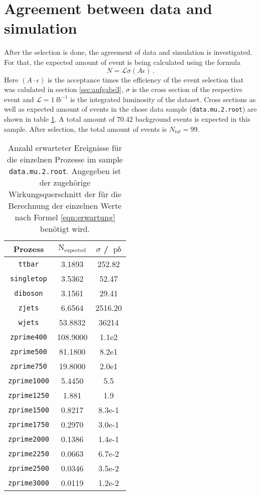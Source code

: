 \section{Agreement between data and simulation}
After the selection is done, the agreement of data and simulation is investigated.
For that, the expected amount of event is being calculated using the formula
\begin{equation}
N = \mathcal{L} \sigma (A \epsilon)\,.
\label{eqn:erwartung}
\end{equation}
Here $(A \cdot \epsilon)$ is the acceptance times the efficiency of the event selection that was calulated in section \ref{sec:aufgabe3}, $\sigma$ is the cross section of the respective event and $\mathcal{L} = \SI{1}{\femto b}^{-1}$ is the integrated luminosity of the dataset.
Cross sections as well as expected amount of events in the chose data sample (\texttt{data.mu.2.root}) are shown in table \ref{tab:Erwartungen}.
A total amount of $70.42$ background events is expected in this sample. After selection, the total amount of events is $N_{tot} = 99$.
\begin{table}[H]
    \centering
    \caption{Anzahl erwarteter Ereignisse für die einzelnen Prozesse im sample \texttt{data.mu.2.root}. Angegeben
    ist der zugehörige Wirkungsquerschnitt der für die Berechnung der einzelnen Werte nach Formel
    \eqref{eqn:erwartung} benötigt wird.}
    \label{tab:Erwartungen}
    \begin{tabular}{c|cc}
    \toprule
    Prozess & $\text{N}_\text{expected}$ & $\sigma$ / $\SI{}{\pico b}$ \\
    \midrule
    \texttt{ttbar}      &  3.1893  & 252.82    \\
    \texttt{singletop}  &  3.5362   & 52.47     \\
    \texttt{diboson}    &  3.1561   & 29.41     \\
    \texttt{zjets}      &  6.6564   & 2516.20   \\
    \texttt{wjets}      &  53.8832  & 36214     \\
    \texttt{zprime400}  &  108.9000 & 1.1e2     \\
    \texttt{zprime500}  &  81.1800  & 8.2e1     \\
    \texttt{zprime750}  &  19.8000  & 2.0e1     \\
    \texttt{zprime1000} &  5.4450  & 5.5       \\
    \texttt{zprime1250} &  1.881 & 1.9       \\
    \texttt{zprime1500} &  0.8217   & 8.3e-1    \\
    \texttt{zprime1750} &  0.2970   & 3.0e-1    \\
    \texttt{zprime2000} &  0.1386   & 1.4e-1    \\
    \texttt{zprime2250} &  0.0663  & 6.7e-2    \\
    \texttt{zprime2500} &  0.0346   & 3.5e-2    \\
    \texttt{zprime3000} &  0.0119   & 1.2e-2    \\
    \bottomrule
    \end{tabular}
\end{table}

